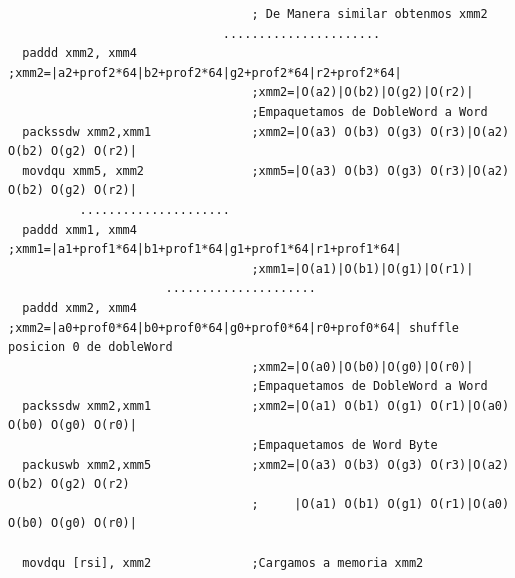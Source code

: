 \begin{codesnippet}
\begin{verbatim}    
                                  ; De Manera similar obtenmos xmm2
                              ......................			
  paddd xmm2, xmm4                ;xmm2=|a2+prof2*64|b2+prof2*64|g2+prof2*64|r2+prof2*64|
                                  ;xmm2=|O(a2)|O(b2)|O(g2)|O(r2)|	
                                  ;Empaquetamos de DobleWord a Word	
  packssdw xmm2,xmm1              ;xmm2=|O(a3) O(b3) O(g3) O(r3)|O(a2) O(b2) O(g2) O(r2)|
  movdqu xmm5, xmm2               ;xmm5=|O(a3) O(b3) O(g3) O(r3)|O(a2) O(b2) O(g2) O(r2)|
          .....................
  paddd xmm1, xmm4                ;xmm1=|a1+prof1*64|b1+prof1*64|g1+prof1*64|r1+prof1*64|
                                  ;xmm1=|O(a1)|O(b1)|O(g1)|O(r1)|						
                      .....................
  paddd xmm2, xmm4                ;xmm2=|a0+prof0*64|b0+prof0*64|g0+prof0*64|r0+prof0*64| shuffle posicion 0 de dobleWord
                                  ;xmm2=|O(a0)|O(b0)|O(g0)|O(r0)|                   
                                  ;Empaquetamos de DobleWord a Word
  packssdw xmm2,xmm1              ;xmm2=|O(a1) O(b1) O(g1) O(r1)|O(a0) O(b0) O(g0) O(r0)|						
                                  ;Empaquetamos de Word Byte
  packuswb xmm2,xmm5              ;xmm2=|O(a3) O(b3) O(g3) O(r3)|O(a2) O(b2) O(g2) O(r2)
                                  ;     |O(a1) O(b1) O(g1) O(r1)|O(a0) O(b0) O(g0) O(r0)|                      

  movdqu [rsi], xmm2              ;Cargamos a memoria xmm2                        			
\end{verbatim}
\end{codesnippet}

